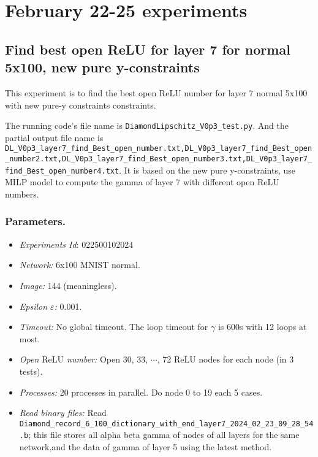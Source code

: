\documentclass{llncs}
\newcommand{\ReLU}{\mathrm{ReLU}}
\begin{document}
\section{February 22-25 experiments}

\subsection{Find best open ReLU for layer 7 for normal 5x100, new pure y-constraints}

This experiment is to find the best open ReLU number for layer 7 normal 5x100 with new pure-y constraints constraints.

\vspace*{1ex}

The running code's file name is \verb*|DiamondLipschitz_V0p3_test.py|. And the partial output file name is \verb*|DL_V0p3_layer7_find_Best_open_number.txt,DL_V0p3_layer7_find_Best_open_number2.txt,DL_V0p3_layer7_find_Best_open_number3.txt,DL_V0p3_layer7_find_Best_open_number4.txt|.  It is based on the new pure y-constraints, use MILP model to compute the gamma of layer 7 with different open ReLU numbers.

\subsubsection*{Parameters.}

\begin{itemize}
	\item\emph{Experiments Id}: 022500102024
	
	\item\emph{Network:} 6x100 MNIST normal. 
	
	\item\emph{Image:} 144 (meaningless).
	
	\item\emph{Epsilon $\varepsilon$:} 0.001.
	
	\item\emph{Timeout:} No global timeout. The loop timeout for $\gamma$ is 600s with 12 loops at most.
	
	\item\emph{Open $\ReLU$ number:} Open 30, 33, $\cdots$, 72 ReLU nodes for each node (in 3 tests).
	
	\item\emph{Processes:} 20 processes in parallel. Do node 0 to 19 each 5 cases.
	
	\item\emph{Read binary files:} Read \verb*|Diamond_record_6_100_dictionary_with_end_layer7_2024_02_23_09_28_54.b|; this file stores all alpha beta gamma of nodes of all layers for the same network,and the data of gamma of layer 5 using the latest method. 
\end{itemize}
\end{document}
